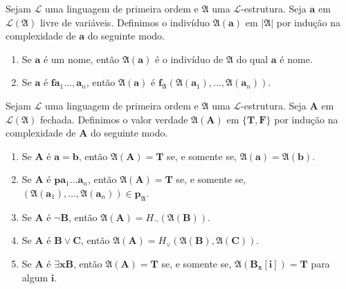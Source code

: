\begin{definition}
    Sejam $\mathcal{L}$ uma linguagem de primeira ordem e $\mathfrak{A}$ uma $\mathcal{L}$-estrutura. Seja $\mathbf{a}$ em $\mathcal{L}(\mathfrak{A})$ livre de variáveis. Definimos o indivíduo $\mathfrak{A}(\mathbf{a})$ em $|\mathfrak{A}|$ por indução na complexidade de $\mathbf{a}$ do seguinte modo.
        \begin{enumerate}[label=\roman*.]
            \item Se $\mathbf{a}$ é um nome, então $\mathfrak{A}(\mathbf{a})$ é o indivíduo de $\mathfrak{A}$ do qual $\mathbf{a}$ é nome.
            \item Se $\mathbf{a}$ é $\mathbf{f} \mathbf{a}_1 \ldots, \mathbf{a}_n$, então $\mathfrak{A}(\mathbf{a})$ é $\mathbf{f}_{\mathfrak{A}}(\mathfrak{A}(\mathbf{a}_1), \ldots, \mathfrak{A}(\mathbf{a}_n))$.
        \end{enumerate}
\end{definition}

\begin{definition}
    Sejam $\mathcal{L}$ uma linguagem de primeira ordem e $\mathfrak{A}$ uma $\mathcal{L}$-estrutura. Seja $\mathbf{A}$ em $\mathcal{L}(\mathfrak{A})$ fechada. Definimos o valor verdade $\mathfrak{A}(\mathbf{A})$ em $\{\mathbf{T}, \mathbf{F}\}$ por indução na complexidade de $\mathbf{A}$ do seguinte modo.
        \begin{enumerate}[label=\roman*.]
            \item Se $\mathbf{A}$ é $\mathbf{a} = \mathbf{b}$, então $\mathfrak{A}(\mathbf{A}) = \mathbf{T}$ se, e somente se, $\mathfrak{A}(\mathbf{a}) = \mathfrak{A}(\mathbf{b})$.
            \item Se $\mathbf{A}$ é $\mathbf{p} \mathbf{a}_1 \ldots \mathbf{a}_n$, então $\mathfrak{A}(\mathbf{A}) = \mathbf{T}$ se, e somente se, $(\mathfrak{A}(\mathbf{a}_1), \ldots, \mathfrak{A}(\mathbf{a}_n)) \in \mathbf{p}_\mathfrak{A}$.
            \item Se $\mathbf{A}$ é $\neg \mathbf{B}$, então $\mathfrak{A}(\mathbf{A}) = H_{\neg}(\mathfrak{A}(\mathbf{B}))$.
            \item Se $\mathbf{A}$ é $\mathbf{B} \lor \mathbf{C}$, então $\mathfrak{A}(\mathbf{A}) = H_{\lor}(\mathfrak{A}(\mathbf{B}), \mathfrak{A}(\mathbf{C}))$.
            \item Se $\mathbf{A}$ é $\exists \mathbf{x} \mathbf{B}$, então $\mathfrak{A}(\mathbf{A}) = \mathbf{T}$ se, e somente se, $\mathfrak{A}(\mathbf{B}_{\mathbf{x}}[\mathbf{i}]) = \mathbf{T}$ para algum $\mathbf{i}$.
        \end{enumerate}
\end{definition}

